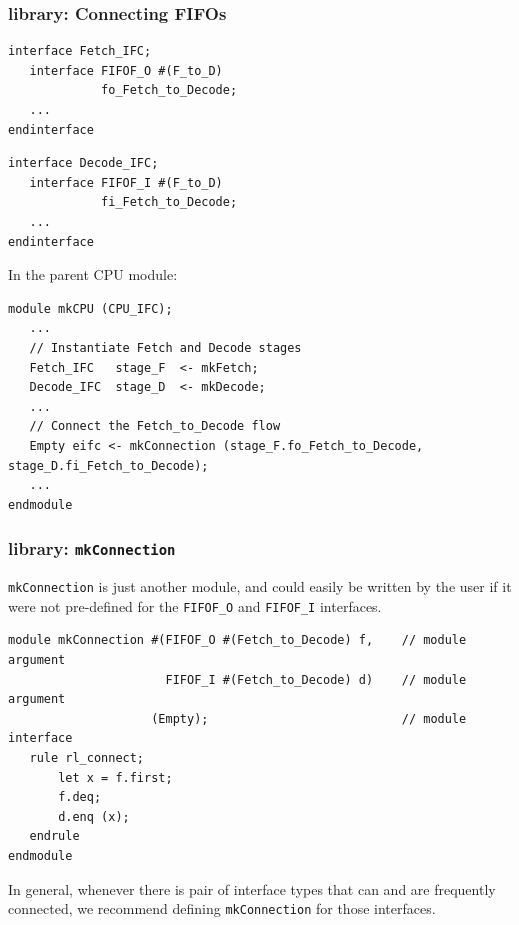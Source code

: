 \begin{frame}[fragile]
\frametitle{{\BSV} library: Connecting FIFOs}

\footnotesize

\begin{center}
\begin{minipage}{0.4\textwidth}
\begin{Verbatim}[frame=single]
interface Fetch_IFC;
   interface FIFOF_O #(F_to_D)
             fo_Fetch_to_Decode;
   ...
endinterface
\end{Verbatim}
\end{minipage}
\hmm
\begin{minipage}{0.4\textwidth}
\begin{Verbatim}[frame=single]
interface Decode_IFC;
   interface FIFOF_I #(F_to_D)
             fi_Fetch_to_Decode;
   ...
endinterface
\end{Verbatim}
\end{minipage}
\end{center}

\vspace{2ex}

In the parent CPU module:

\begin{Verbatim}[frame=single]
module mkCPU (CPU_IFC);
   ...
   // Instantiate Fetch and Decode stages
   Fetch_IFC   stage_F  <- mkFetch;
   Decode_IFC  stage_D  <- mkDecode;
   ...
   // Connect the Fetch_to_Decode flow
   Empty eifc <- mkConnection (stage_F.fo_Fetch_to_Decode, stage_D.fi_Fetch_to_Decode);
   ...
endmodule
\end{Verbatim}

\end{frame}


\begin{frame}[fragile]
\frametitle{{\BSV} library: {\tt mkConnection}}

\footnotesize

{\tt mkConnection} is just another module, and could easily be written
by the user if it were not pre-defined for the \verb|FIFOF_O| and
\verb|FIFOF_I| interfaces.

\begin{Verbatim}[frame=single]
module mkConnection #(FIFOF_O #(Fetch_to_Decode) f,    // module argument
                      FIFOF_I #(Fetch_to_Decode) d)    // module argument
                    (Empty);                           // module interface
   rule rl_connect;
       let x = f.first;
       f.deq;
       d.enq (x);
   endrule
endmodule
\end{Verbatim}

\PAUSE{\vspace{4ex}}

In general, whenever there is pair of interface types that can and are
frequently connected, we recommend defining {\tt mkConnection} for
those interfaces.

\end{frame}

